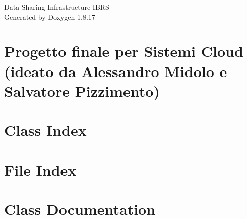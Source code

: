 \let\mypdfximage\pdfximage\def\pdfximage{\immediate\mypdfximage}\documentclass[twoside]{book}
\newcommand{\+}{\discretionary{\mbox{\scriptsize$\hookleftarrow$}}{}{}}
\newcommand{\clearemptydoublepage}{%
  \newpage{\pagestyle{empty}\cleardoublepage}%
}
\begin{document}
\hypersetup{pageanchor=false,
             bookmarksnumbered=true,
             pdfencoding=unicode
            }
\begin{titlepage}
\vspace*{7cm}
\begin{center}%
{\Large Data Sharing Infrastructure I\+B\+RS }\\
\vspace*{1cm}
{\large Generated by Doxygen 1.8.17}\\
\end{center}
\end{titlepage}
\clearemptydoublepage
{}
\tableofcontents
\clearemptydoublepage
{}
\hypersetup{pageanchor=true}

\chapter{Progetto finale per Sistemi Cloud (ideato da Alessandro Midolo e Salvatore Pizzimento)}
\label{index}\hypertarget{index}{}
\chapter{Class Index}

\chapter{File Index}

\chapter{Class Documentation}







\end{document}
